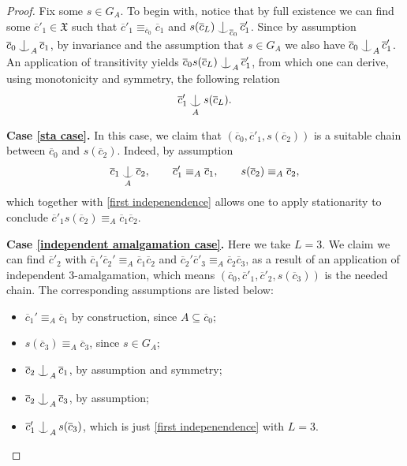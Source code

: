 \documentclass{article}
\theoremstyle{remark}
\theoremstyle{definition}
\newcommand{\X}[0]{\mathfrak{X}}
\def\Ind#1#2{#1\setbox0=\hbox{$#1x$}\kern\wd0\hbox to 0pt{\hss$#1\mid$\hss}
	\lower.9\ht0\hbox to 0pt{\hss$#1\smile$\hss}\kern\wd0}
\def\ind{\mathop{\mathpalette\Ind{}}}
\newcommand{\orq}[0]{\equiv}
\begin{document}
{{{{{\begin{proof}
  	Fix some $s\in G_{A}$. To begin with, notice that by full existence we can find some $\overline{c}'_{1}\in\X$ such that $\overline{c}'_{1}\orq_{\overline{c}_{0}}\overline{c}_{1}$ and 
  	$s(\overline{c}_{L})\ind_{\overline{c}_{0}} \overline{c}'_{1}$. Since by assumption $\overline{c}_{0}\ind_{A} \overline{c}_{1}$, by invariance and the assumption that $s\in G_{A}$ we also have $\overline{c}_{0}\ind_{A} \overline{c}'_{1}$. An application of transitivity yields $\overline{c}_{0}s(\overline{c}_{L})\ind_{A} \overline{c}_{1}'$, from which one can derive, using monotonicity and symmetry, the following relation
  	\begin{equation}\label{first indepenendence}
  		\overline{c}_{1}'\ind_{A} s(\overline{c}_{L}).
  	\end{equation}
  	
  	\textbf{Case \ref{sta case}.} In this case, we claim that $(\overline{c}_{0},\overline{c}'_{1},s(\overline{c}_{2}))$ is a suitable chain between $\overline{c}_{0}$ and $s(\overline{c}_{2})$. Indeed, by assumption
  	\begin{equation*}
  	  \overline{c}_{1}\ind_{A} \overline{c}_{2},\quad\quad \overline{c}_{1}'\orq_{A}\overline{c}_{1},\quad\quad s(\overline{c}_{2})\orq_{A}\overline{c}_{2},
  	\end{equation*}
  	which together with \eqref{first indepenendence} allows one to apply stationarity to conclude $\overline{c}'_{1}s(\overline{c}_{2})\orq_{A}\overline{c}_{1}\overline{c}_{2}$.   
  	
  	\textbf{Case \ref{independent amalgamation case}.} Here we take $L=3$. We claim we can find $\overline{c}'_{2}$ with $\overline{c}_{1}'\overline{c}_{2}'\orq_{A}\overline{c}_{1}\overline{c}_{2}$ and $\overline{c}_{2}'\overline{c}'_{3}\orq_{A}\overline{c}_{2}\overline{c}_{3}$, as a result of an application of independent $3$-amalgamation, which means $(\overline{c}_{0},\overline{c}'_{1},\overline{c}'_{2},s(\overline{c}_{3}))$ is the needed chain.
  	The corresponding assumptions are listed below: 
  	\begin{itemize}
  		\item $\overline{c}_{1}'\orq_{A}\overline{c}_{1}$ by construction, since $A\subseteq \overline{c}_{0}$;
  		\item $s(\overline{c}_{3})\orq_{A} \overline{c}_{3}$, since $s\in G_{A}$;
  		\item $\overline{c}_{2}\ind_{A} \overline{c}_{1}$, by assumption and symmetry;
  		\item $\overline{c}_{2}\ind_{A} \overline{c}_{3}$, by assumption;
  		\item $\overline{c}'_{1}\ind_{A} s(\overline{c}_{3})$, which is just \eqref{first indepenendence} with $L=3$.
  	\end{itemize}	
  \end{proof}
  
}}}}}
\end{document}
